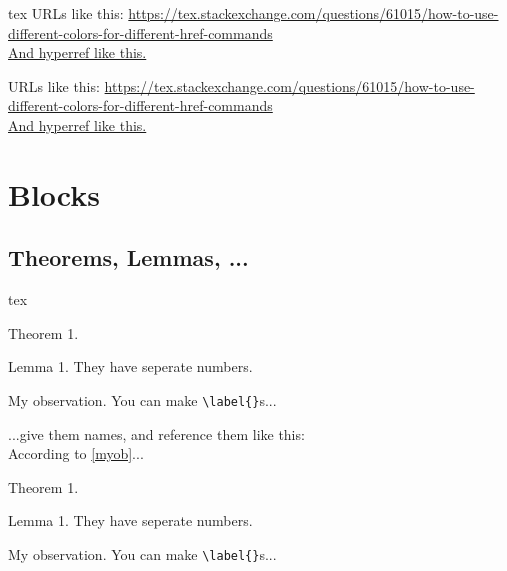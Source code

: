 \documentclass{fhw}
\begin{document}
\begin{Code}{tex}
URLs like this: \url{https://tex.stackexchange.com/questions/61015/how-to-use-different-colors-for-different-href-commands}\\
\href{https://en.wikibooks.org/wiki/LaTeX/Counters}{And hyperref like this.}
\end{Code}
URLs like this: \url{https://tex.stackexchange.com/questions/61015/how-to-use-different-colors-for-different-href-commands}\\
\href{https://en.wikibooks.org/wiki/LaTeX/Counters}{And hyperref like this.}

\section{Blocks}

\subsection{Theorems, Lemmas, ...}

\begin{Code}{tex}
\begin{theorem}
  Theorem 1. \blindtext
\end{theorem}

\begin{lemma}
  Lemma 1. They have seperate numbers.
\end{lemma}

\begin{observation}
  My observation. You can make \verb|\label{}|s...
  \label{myob}
\end{observation}

\begin{lemma}[My lemma]
  ...give them names, and reference them like this:\\
  According to \cref{myob}...
\end{lemma}
\end{Code}

\begin{theorem}
	Theorem 1. \blindtext
\end{theorem}

\begin{lemma}
	Lemma 1. They have seperate numbers.
\end{lemma}

\begin{observation}
  My observation. You can make \verb|\label{}|s...
	\label{myob}
\end{observation}
\end{document}
